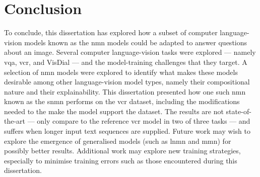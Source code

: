 \chapter{Conclusion}
\label{chp:conclusion}

To conclude, this dissertation has explored how a subset of computer language-vision models known as the \gls{nmn} models could be adapted to answer questions about an image.
Several computer language-vision tasks were explored --- namely \gls{vqa}, \gls{vcr}, and VisDial --- and the model-training challenges that they target.
A selection of \gls{nmn} models were explored to identify what makes these models desirable among other language-vision model types, namely their compositional nature and their explainability.
This dissertation presented how one such \gls{nmn} known as the \gls{snmn} performs on the \gls{vcr} dataset, including the modifications needed to the make the model support the dataset.
The results are not state-of-the-art --- only compare to the reference \gls{vcr} model in two of three tasks --- and suffers when longer input text sequences are supplied.
Future work may wish to explore the emergence of generalised models (such as \gls{lnmn} and \gls{mmn}) for possibly better results.
Additional work may explore new training strategies, especially to minimise training errors such as those encountered during this dissertation.

